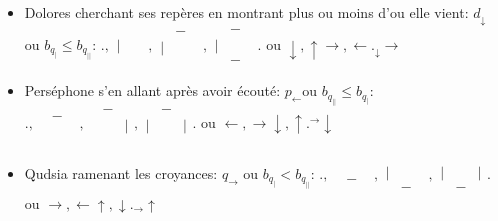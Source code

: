 \documentclass{article}
\begin{document}
\begin{itemize}
\item Dolores cherchant ses repères en montrant plus ou moins d'ou elle vient: 
\subitem $d_\downarrow$ ou $b_{q_|}\le b_{q_{||}}$: 
$.,
\begin{matrix}
 && \\
 |&&\\
&&
\end{matrix},
\begin{matrix}
 &-& \\
 |&&\\
&&
\end{matrix},
\begin{matrix}
 &-& \\
 |&&\\
&-&
\end{matrix}.$ ou $\downarrow, \uparrow \rightarrow,\leftarrow ._\downarrow  \rightarrow$
\item Perséphone s'en allant après avoir écouté:   
\subitem  $p_\leftarrow$ou  $b_{q_{||}}\le b_{q_{|}}$: 
$.,
\begin{matrix}
 &-& \\
 &&\\
&&
\end{matrix},
\begin{matrix}
 &-& \\
 &&|\\
&&
\end{matrix},
\begin{matrix}
 &-& \\
 |&&|\\
&&
\end{matrix}.$  ou $\leftarrow, \rightarrow \downarrow, \uparrow .^\rightarrow \downarrow$
\item Qudsia ramenant les croyances: 
\subitem $q_\rightarrow$ ou  $b_{q_{|}}< b_{q_{||}}$:
 $.,
\begin{matrix}
 && \\
 &&\\
&-&
\end{matrix},
\begin{matrix}
 && \\
 |&&\\
&-&
\end{matrix},
\begin{matrix}
 && \\
 |&&|\\
&-&
\end{matrix}$.  ou $\rightarrow,  \leftarrow \uparrow ,\downarrow ._\rightarrow \uparrow$

\end{itemize}
\end{document}

